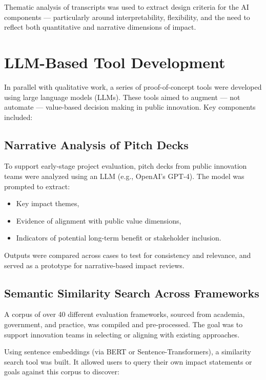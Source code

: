 Thematic analysis of transcripts was used to extract design criteria for the AI components — particularly around interpretability, flexibility, and the need to reflect both quantitative and narrative dimensions of impact.

\section{LLM-Based Tool Development}

In parallel with qualitative work, a series of proof-of-concept tools were developed using large language models (LLMs). These tools aimed to augment — not automate — value-based decision making in public innovation. Key components included:

\subsection{Narrative Analysis of Pitch Decks}

To support early-stage project evaluation, pitch decks from public innovation teams were analyzed using an LLM (e.g., OpenAI’s GPT-4). The model was prompted to extract:

\begin{itemize}
    \item Key impact themes,
    \item Evidence of alignment with public value dimensions,
    \item Indicators of potential long-term benefit or stakeholder inclusion.
\end{itemize}

Outputs were compared across cases to test for consistency and relevance, and served as a prototype for narrative-based impact reviews.

\subsection{Semantic Similarity Search Across Frameworks}

A corpus of over 40 different evaluation frameworks, sourced from academia, government, and practice, was compiled and pre-processed. The goal was to support innovation teams in selecting or aligning with existing approaches.

Using sentence embeddings (via BERT or Sentence-Transformers), a similarity search tool was built. It allowed users to query their own impact statements or goals against this corpus to discover:

